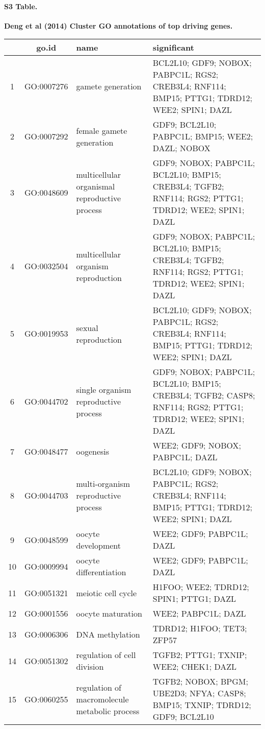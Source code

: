 \documentclass[10pt,letterpaper]{article}
\begin{document}
\paragraph*{S3 Table.}
\label{supptab3}
{\bf Deng et al (2014) Cluster GO annotations of top driving genes.}

\begin{table}[!hp]
\begin{adjustwidth}{-.5in}{0in}
\begin{tabular}{|c|c|p{1.5in}|p{4in}|}
  \hline
 & go.id & name & significant \\
  \hline
1 & GO:0007276 & gamete generation & \footnotesize{BCL2L10; GDF9; NOBOX; PABPC1L; RGS2; CREB3L4; RNF114; BMP15; PTTG1; TDRD12; WEE2; SPIN1; DAZL} \\
  2 & GO:0007292 & female gamete generation & \footnotesize{GDF9; BCL2L10; PABPC1L; BMP15; WEE2; DAZL; NOBOX} \\
  3 & GO:0048609 & multicellular organismal reproductive process & \footnotesize{GDF9; NOBOX; PABPC1L; BCL2L10; BMP15; CREB3L4; TGFB2; RNF114; RGS2; PTTG1; TDRD12; WEE2; SPIN1; DAZL} \\
  4 & GO:0032504 & multicellular organism reproduction & \footnotesize{GDF9; NOBOX; PABPC1L; BCL2L10; BMP15; CREB3L4; TGFB2; RNF114; RGS2; PTTG1; TDRD12; WEE2; SPIN1; DAZL}\\
  5 & GO:0019953 & sexual reproduction & \footnotesize{BCL2L10; GDF9; NOBOX; PABPC1L; RGS2; CREB3L4; RNF114; BMP15; PTTG1; TDRD12; WEE2; SPIN1; DAZL} \\
  6 & GO:0044702 & single organism reproductive process & \footnotesize{GDF9; NOBOX; PABPC1L; BCL2L10; BMP15; CREB3L4; TGFB2; CASP8; RNF114; RGS2; PTTG1; TDRD12; WEE2; SPIN1; DAZL} \\
  7 & GO:0048477 & oogenesis & \footnotesize{WEE2; GDF9; NOBOX; PABPC1L; DAZL} \\
  8 & GO:0044703 & multi-organism reproductive process & \footnotesize{BCL2L10; GDF9; NOBOX; PABPC1L; RGS2; CREB3L4; RNF114; BMP15; PTTG1; TDRD12; WEE2; SPIN1; DAZL} \\
  9 & GO:0048599 & oocyte development  & \footnotesize{WEE2; GDF9; PABPC1L; DAZL} \\
  10 & GO:0009994 & oocyte differentiation & \footnotesize{WEE2; GDF9; PABPC1L; DAZL} \\
  11 & GO:0051321 & meiotic cell cycle & \footnotesize{H1FOO; WEE2; TDRD12; SPIN1; PTTG1; DAZL} \\
  12 & GO:0001556 & oocyte maturation & \footnotesize{WEE2; PABPC1L; DAZL} \\
  13 & GO:0006306 & DNA methylation & \footnotesize{TDRD12; H1FOO; TET3; ZFP57} \\
  14 & GO:0051302 & regulation of cell division & \footnotesize{TGFB2; PTTG1; TXNIP; WEE2; CHEK1; DAZL} \\
  15 & GO:0060255 & regulation of macromolecule metabolic process & \footnotesize{TGFB2; NOBOX; BPGM; UBE2D3; NFYA; CASP8; BMP15; TXNIP; TDRD12; GDF9; BCL2L10} \\
 \hline
\end{tabular}
\end{adjustwidth}
\end{table}
\end{document}
